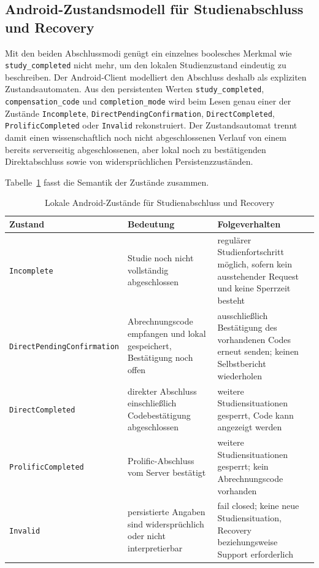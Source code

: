 
\begin{neu}
\section{Android-Zustandsmodell für Studienabschluss und Recovery}

Mit den beiden Abschlussmodi genügt ein einzelnes boolesches Merkmal wie \texttt{study\_completed} nicht mehr, um den lokalen Studienzustand eindeutig zu beschreiben. Der Android-Client modelliert den Abschluss deshalb als expliziten Zustandsautomaten. Aus den persistenten Werten \texttt{study\_completed}, \texttt{compensation\_code} und \texttt{completion\_mode} wird beim Lesen genau einer der Zustände \texttt{Incomplete}, \texttt{DirectPendingConfirmation}, \texttt{DirectCompleted}, \texttt{ProlificCompleted} oder \texttt{Invalid} rekonstruiert. Der Zustandsautomat trennt damit einen wissenschaftlich noch nicht abgeschlossenen Verlauf von einem bereits serverseitig abgeschlossenen, aber lokal noch zu bestätigenden Direktabschluss sowie von widersprüchlichen Persistenzzuständen.

Tabelle~\ref{tab:android-completion-state} fasst die Semantik der Zustände zusammen.

\begin{table}[htbp]
\centering
\caption{Lokale Android-Zustände für Studienabschluss und Recovery}
\label{tab:android-completion-state}
\begin{tabular}{p{}p{}p{}}
\textbf{Zustand} & \textbf{Bedeutung} & \textbf{Folgeverhalten} \\
\hline
\texttt{Incomplete} & Studie noch nicht vollständig abgeschlossen & regulärer Studienfortschritt möglich, sofern kein ausstehender Request und keine Sperrzeit besteht \\
\texttt{DirectPendingConfirmation} & Abrechnungscode empfangen und lokal gespeichert, Bestätigung noch offen & ausschließlich Bestätigung des vorhandenen Codes erneut senden; keinen Selbstbericht wiederholen \\
\texttt{DirectCompleted} & direkter Abschluss einschließlich Codebestätigung abgeschlossen & weitere Studiensituationen gesperrt, Code kann angezeigt werden \\
\texttt{ProlificCompleted} & Prolific-Abschluss vom Server bestätigt & weitere Studiensituationen gesperrt; kein Abrechnungscode vorhanden \\
\texttt{Invalid} & persistierte Angaben sind widersprüchlich oder nicht interpretierbar & fail closed; keine neue Studiensituation, Recovery beziehungsweise Support erforderlich \\
\end{tabular}
\end{table}


\end{neu}
